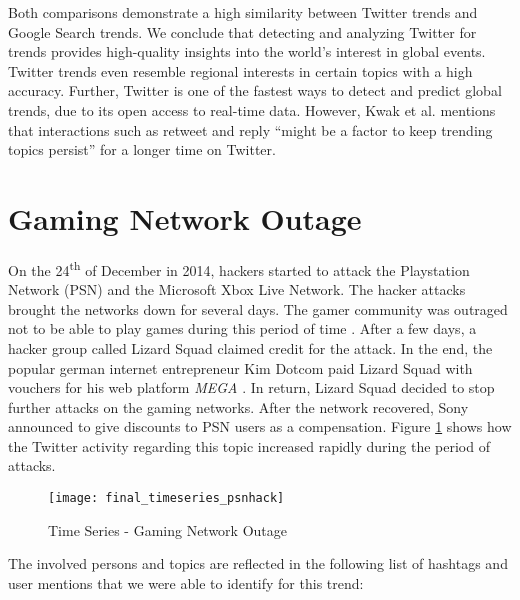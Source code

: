 Both comparisons demonstrate a high similarity between Twitter trends and Google Search trends. We conclude that detecting and analyzing Twitter for trends provides high-quality insights into the world’s interest in global events. Twitter trends even resemble regional interests in certain topics with a high accuracy. Further, Twitter is one of the fastest ways to detect and predict global trends, due to its open access to real-time data. However, Kwak et al. mentions that interactions such as retweet and reply \enquote{might be a factor to keep trending topics persist} for a longer time on Twitter.

\section{Gaming Network Outage}
\label{sec:christmas-network-outage}
On the 24\textsuperscript{th} of December in 2014, hackers started to attack the Playstation Network (PSN) and the Microsoft Xbox Live Network. The hacker attacks brought the networks down for several days. The gamer community was outraged not to be able to play games during this period of time \cite{wool2014sony}. After a few days, a hacker group called Lizard Squad claimed credit for the attack. In the end, the popular german internet entrepreneur Kim Dotcom paid Lizard Squad with vouchers for his web platform \textit{MEGA} \cite{Dotcom2014}. In return, Lizard Squad decided to stop further attacks on the gaming networks. After the network recovered, Sony announced to give discounts to PSN users as a compensation. Figure \ref{fig:christmas-network-outage-time-series} shows how the Twitter activity regarding this topic increased rapidly during the period of attacks.

\begin{figure}[H]
  \centering
        \texttt{[image: final\_timeseries\_psnhack]}
  \caption[Time Series - Gaming Network Outage]{Time Series - Gaming Network Outage}
  \label{fig:christmas-network-outage-time-series}
  \vspace{-1.3em}
\end{figure}

The involved persons and topics are reflected in the following list of hashtags and user mentions that we were able to identify for this trend:

